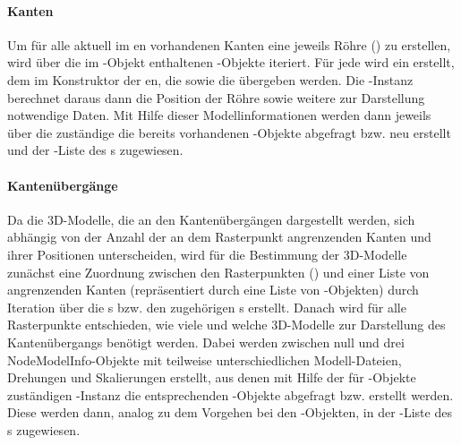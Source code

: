 \paragraph{Kanten}

Um für alle aktuell im en vorhandenen Kanten eine jeweils Röhre () zu erstellen, wird über die im -Objekt enthaltenen -Objekte iteriert. Für jede  wird ein  erstellt, dem im Konstruktor der en, die  sowie die  übergeben werden. Die -Instanz berechnet daraus dann die Position der Röhre sowie weitere zur Darstellung notwendige Daten. Mit Hilfe dieser Modellinformationen werden dann jeweils über die zuständige  die bereits vorhandenen -Objekte abgefragt bzw. neu erstellt und der -Liste des s zugewiesen.

\paragraph{Kantenübergänge}

Da die 3D-Modelle, die an den Kantenübergängen dargestellt werden, sich abhängig von der Anzahl der an dem Rasterpunkt angrenzenden Kanten und ihrer Positionen unterscheiden, wird für die Bestimmung der 3D-Modelle zunächst eine Zuordnung zwischen den Rasterpunkten () und einer Liste von angrenzenden Kanten (repräsentiert durch eine Liste von -Objekten) durch Iteration über die s bzw. den zugehörigen s erstellt. Danach wird für alle Rasterpunkte entschieden, wie viele und welche 3D-Modelle zur Darstellung des Kantenübergangs benötigt werden. Dabei werden zwischen null und drei NodeModelInfo-Objekte mit teilweise unterschiedlichen Modell-Dateien, Drehungen und Skalierungen erstellt, aus denen mit Hilfe der für -Objekte zuständigen -Instanz die entsprechenden -Objekte abgefragt bzw. erstellt werden. Diese werden dann, analog zu dem Vorgehen bei den -Objekten, in der -Liste des s zugewiesen.



